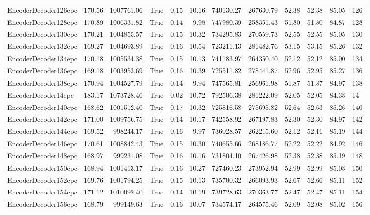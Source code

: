 \begin{tabular}{lrrlrrrrrrrl}
EncoderDecoder126epc & 170.56 & 1007761.06 & True & 0.15 & 10.16 & 740130.27 & 267630.79 & 52.38 & 52.38 & 85.05 & 126 \\
EncoderDecoder128epc & 170.89 & 1006331.82 & True & 0.14 & 9.98 & 747980.39 & 258351.43 & 51.80 & 51.80 & 84.87 & 128 \\
EncoderDecoder130epc & 170.21 & 1004855.57 & True & 0.15 & 10.32 & 734295.83 & 270559.73 & 52.55 & 52.55 & 85.05 & 130 \\
EncoderDecoder132epc & 169.27 & 1004693.89 & True & 0.16 & 10.54 & 723211.13 & 281482.76 & 53.15 & 53.15 & 85.26 & 132 \\
EncoderDecoder134epc & 170.18 & 1005534.38 & True & 0.15 & 10.13 & 741183.97 & 264350.40 & 52.12 & 52.12 & 85.00 & 134 \\
EncoderDecoder136epc & 169.18 & 1003953.69 & True & 0.16 & 10.39 & 725511.82 & 278441.87 & 52.96 & 52.95 & 85.27 & 136 \\
EncoderDecoder138epc & 170.94 & 1004527.79 & True & 0.14 & 9.94 & 747565.81 & 256961.98 & 51.87 & 51.87 & 84.97 & 138 \\
EncoderDecoder14epc & 183.17 & 1073728.46 & True & 0.02 & 10.72 & 792506.38 & 281222.09 & 52.05 & 52.05 & 84.38 & 14 \\
EncoderDecoder140epc & 168.62 & 1001512.40 & True & 0.17 & 10.32 & 725816.58 & 275695.82 & 52.64 & 52.63 & 85.26 & 140 \\
EncoderDecoder142epc & 171.00 & 1009756.75 & True & 0.14 & 10.17 & 742558.92 & 267197.83 & 52.30 & 52.30 & 84.97 & 142 \\
EncoderDecoder144epc & 169.52 & 998244.17 & True & 0.16 & 9.97 & 736028.57 & 262215.60 & 52.12 & 52.11 & 85.19 & 144 \\
EncoderDecoder146epc & 170.61 & 1008842.43 & True & 0.15 & 10.30 & 740655.66 & 268186.77 & 52.22 & 52.22 & 84.92 & 146 \\
EncoderDecoder148epc & 168.97 & 999231.08 & True & 0.16 & 10.16 & 731804.10 & 267426.98 & 52.38 & 52.38 & 85.19 & 148 \\
EncoderDecoder150epc & 168.94 & 1001413.17 & True & 0.16 & 10.27 & 727460.23 & 273952.94 & 52.99 & 52.99 & 85.08 & 150 \\
EncoderDecoder152epc & 169.76 & 1001794.25 & True & 0.15 & 10.13 & 735700.32 & 266093.93 & 52.67 & 52.66 & 85.11 & 152 \\
EncoderDecoder154epc & 171.12 & 1010092.40 & True & 0.14 & 10.19 & 739728.63 & 270363.77 & 52.47 & 52.47 & 85.11 & 154 \\
EncoderDecoder156epc & 168.79 & 999149.63 & True & 0.16 & 10.07 & 734574.17 & 264575.46 & 52.09 & 52.08 & 85.02 & 156 \\

\end{tabular}
